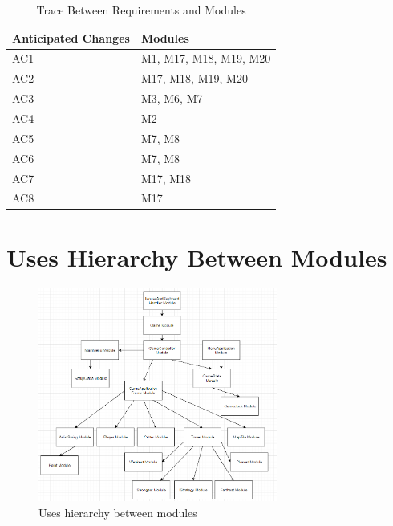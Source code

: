 \documentclass[12,english]{article}
\begin{document}
        \begin{table}[!htbp]
        \begin{tabular}{ll}
        \toprule
        Anticipated Changes & Modules \\
        \midrule
        AC1 & M1, M17, M18, M19, M20\\
        AC2 & M17, M18, M19, M20\\
        AC3 & M3, M6, M7\\
        AC4 & M2\\
        AC5 & M7, M8\\
        AC6 & M7, M8\\
        AC7 & M17, M18\\
        AC8 & M17\\
    
        \bottomrule
        \end{tabular}
        \caption{Trace Between Requirements and Modules}
        \makeatletter
           \def\rulecolor#1#{\CT@arc{#1}}
           \def\CT@arc#1#2{%
           \ifdim\baselineskip=\z@\noalign\fi
           {\gdef\CT@arc@{\color#1{#2}}}}
           \let\CT@arc@\relax
        \makeatother
        \label{Table 3}
        \end{table}

\FloatBarrier
\section{Uses Hierarchy Between Modules}

\begin{figure}[h]
\centering
\includegraphics[width=0.7\textwidth]{hierarchy.png}
\caption{Uses hierarchy between modules}
\end{figure}
\end{document}
